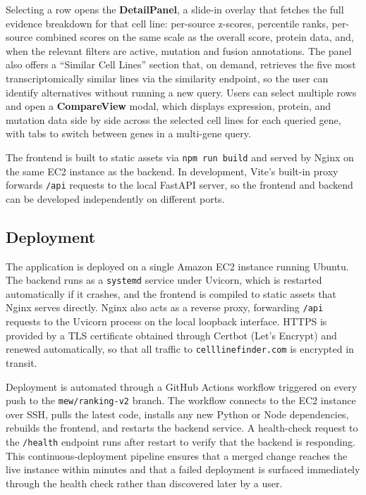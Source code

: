 Selecting a row opens the \textbf{DetailPanel}, a slide-in overlay that fetches the full evidence breakdown for that cell line: per-source z-scores, percentile ranks, per-source combined scores on the same scale as the overall score, protein data, and, when the relevant filters are active, mutation and fusion annotations. The panel also offers a ``Similar Cell Lines'' section that, on demand, retrieves the five most transcriptomically similar lines via the similarity endpoint, so the user can identify alternatives without running a new query. Users can select multiple rows and open a \textbf{CompareView} modal, which displays expression, protein, and mutation data side by side across the selected cell lines for each queried gene, with tabs to switch between genes in a multi-gene query.

The frontend is built to static assets via \texttt{npm run build} and served by Nginx on the same EC2 instance as the backend. In development, Vite's built-in proxy forwards \texttt{/api} requests to the local FastAPI server, so the frontend and backend can be developed independently on different ports.


\subsection{Deployment}
\label{sec:deployment}

The application is deployed on a single Amazon EC2 instance running Ubuntu. The backend runs as a \texttt{systemd} service under Uvicorn, which is restarted automatically if it crashes, and the frontend is compiled to static assets that Nginx serves directly. Nginx also acts as a reverse proxy, forwarding \texttt{/api} requests to the Uvicorn process on the local loopback interface. HTTPS is provided by a TLS certificate obtained through Certbot (Let's Encrypt) and renewed automatically, so that all traffic to \texttt{celllinefinder.com} is encrypted in transit.

Deployment is automated through a GitHub Actions workflow triggered on every push to the \texttt{mew/ranking-v2} branch. The workflow connects to the EC2 instance over SSH, pulls the latest code, installs any new Python or Node dependencies, rebuilds the frontend, and restarts the backend service. A health-check request to the \texttt{/health} endpoint runs after restart to verify that the backend is responding. This continuous-deployment pipeline ensures that a merged change reaches the live instance within minutes and that a failed deployment is surfaced immediately through the health check rather than discovered later by a user.